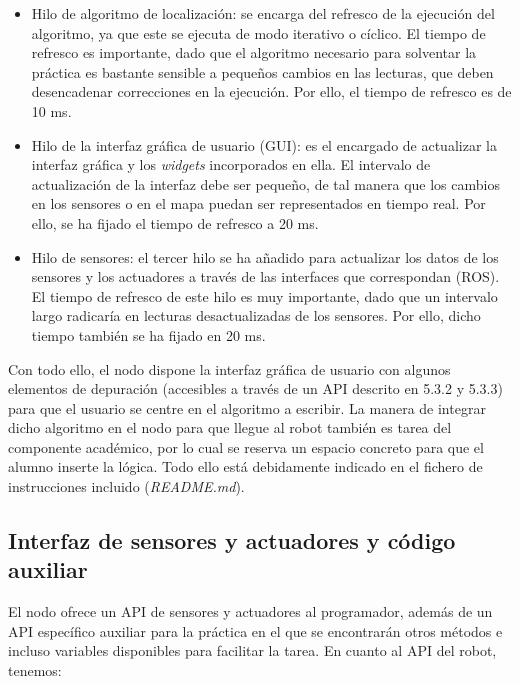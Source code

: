 \begin{itemize}
  \renewcommand{\labelitemi}{$\to$}
	\item Hilo de algoritmo de localización: se encarga del refresco de la ejecución del algoritmo, ya que este se ejecuta de modo iterativo o cíclico. El tiempo de refresco es importante, dado que el algoritmo necesario para solventar la práctica es bastante sensible a pequeños cambios en las lecturas, que deben desencadenar correcciones en la ejecución. Por ello, el tiempo de refresco es de 10 ms.
	\item Hilo de la interfaz gráfica de usuario (GUI): es el encargado de actualizar la interfaz gráfica y los \textit{widgets} incorporados en ella. El intervalo de actualización de la interfaz debe ser pequeño, de tal manera que los cambios en los sensores o en el mapa puedan ser representados en tiempo real. Por ello, se ha fijado el tiempo de refresco a 20 ms.
	\item Hilo de sensores: el tercer hilo se ha añadido para actualizar los datos de los sensores y los actuadores a través de las interfaces que correspondan (ROS). El tiempo de refresco de este hilo es muy importante, dado que un intervalo largo radicaría en lecturas desactualizadas de los sensores. Por ello, dicho tiempo también se ha fijado en 20 ms.
\end{itemize}

Con todo ello, el nodo dispone la interfaz gráfica de usuario con algunos elementos de depuración (accesibles a través de un API descrito en 5.3.2 y 5.3.3) para que el usuario se centre en el algoritmo a escribir. La manera de integrar dicho algoritmo en el nodo para que llegue al robot también es tarea del componente académico, por lo cual se reserva un espacio concreto para que el alumno inserte la lógica. Todo ello está debidamente indicado en el fichero de instrucciones incluido (\textit{README.md}).

\subsection{Interfaz de sensores y actuadores y código auxiliar}
El nodo ofrece un API de sensores y actuadores al programador, además de un API específico auxiliar para la práctica en el que se encontrarán otros métodos e incluso variables disponibles para facilitar la tarea. En cuanto al API del robot, tenemos:

